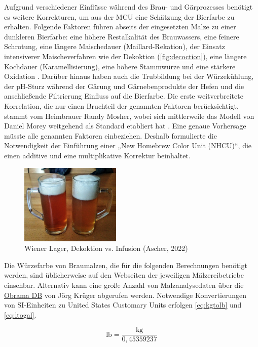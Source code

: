 \documentclass[a4paper,parskip=half]{scrartcl}
\begin{document}
Aufgrund verschiedener Einflüsse während des Brau- und Gärprozesses benötigt es weitere Korrekturen, um aus der MCU eine Schätzung der Bierfarbe zu erhalten. Folgende Faktoren führen abseits der eingesetzten Malze zu einer dunkleren Bierfarbe: eine höhere Restalkalität des Brauwassers, eine feinere Schrotung, eine längere Maischedauer (Maillard-Rekation), der Einsatz intensiverer Maischeverfahren wie der Dekoktion (\autoref{fig:decoction}), eine längere Kochdauer (Karamellisierung), eine höhere Stammwürze und eine stärkere Oxidation \parencites{KrausWeyermann2021c}[55]{Daniels1996}. Darüber hinaus haben auch die Trubbildung bei der Würzekühlung, der pH-Sturz während der Gärung und Gärnebenprodukte der Hefen und die anschließende Filtrierung Einfluss auf die Bierfarbe. Die erste weitverbreitete Korrelation, die nur einen Bruchteil der genannten Faktoren berücksichtigt, stammt vom Heimbrauer Randy Mosher, wobei sich mittlerweile das Modell von Daniel Morey weitgehend als Standard etabliert hat \parencite{KrausWeyermann2021b}. Eine genaue Vorhersage müsste alle genannten Faktoren einbeziehen. Deshalb formulierte \textcite{Colby2000} die Notwendigkeit der Einführung einer „New Homebrew Color Unit (NHCU)“, die einen additive und eine multiplikative Korrektur beinhaltet.

\begin{figure}[H]
\centering
\includegraphics[width=4.8cm]{dekoktion.jpg}
\caption{Wiener Lager, Dekoktion vs. Infusion (Ascher, 2022)}
\label{fig:decoction}
\end{figure}

Die Würzefarbe von Braumalzen, die für die folgenden Berechnungen benötigt werden, sind üblicherweise auf den Webseiten der jeweiligen Mälzereibetriebe einsehbar. Alternativ kann eine große Anzahl von Malzanalysedaten über die \href{https://obrama.mueggelland.de}{Obrama DB} von Jörg Krüger abgerufen werden. Notwendige Konvertierungen von SI-Einheiten zu United States Customary Units erfolgen \autoref{eq:kgtolb} und \autoref{eq:ltogal}.

\begin{equation}
\text{lb} = \frac{\text{kg}}{0,45359237}
\label{eq:kgtolb}
\end{equation}
\end{document}
